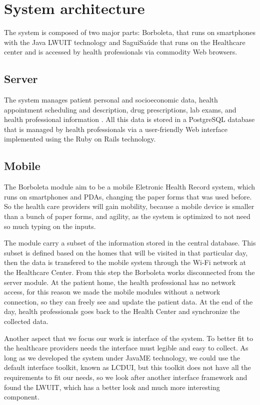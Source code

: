 \documentclass[12pt]{article}
\begin{document}
\section{System architecture}
The system is composed of two major parts: Borboleta, that runs on smartphones with the Java LWUIT technology and SaguiSaúde that runs on the Healthcare center and is accessed by health professionals via commodity Web browsers.

\subsection{Server}
The system manages patient personal and socioeconomic data, health appointment scheduling and description, drug prescriptions, lab exams, and health professional information
\cite{sagui}. All this data is stored in a PostgreSQL database that is managed by health professionals via a user-friendly Web interface implemented using the Ruby on Rails technology.

\subsection{Mobile}
The Borboleta module \cite{correia08} aim to be a mobile Eletronic Health Record system, which runs on smartphones
and PDAs, changing the paper forms that was used before. So the health care providers will gain mobility, because a
mobile device is smaller than a bunch of paper forms, and agility, as the system is optimized to not need so much
typing on the inputs.

The module carry a subset of the information stored in the central database. This subset is defined based on the
homes that will be visited in that particular day, then the data is transfered to the mobile system through the
Wi-Fi network at the Healthcare Center. From this step the Borboleta works disconnected from the server module.
At the patient home, the health professional has no network access, for this reason we made the mobile modules
without a network connection, so they can freely see and update the patient data. At the end of the day, health
professionals goes back to the Health Center and synchronize the collected data.

Another aspect that we focus our work is interface of the system. To better fit to the healthcare providers needs
the interface must legible and easy to collect. As long as we developed the system under JavaME technology,
we could use the default interface toolkit, known as LCDUI, but this toolkit does not have all the requirements
to fit our needs, so we look after another interface framework and found the LWUIT, which has a better look and
much more interesting component.
\end{document}
